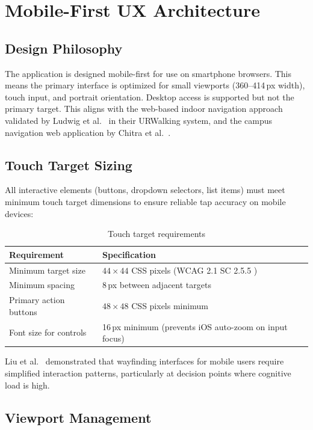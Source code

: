 \section{Mobile-First UX Architecture}
\label{sec:mobile-ux}

\subsection{Design Philosophy}

The application is designed mobile-first for use on smartphone browsers. This means the primary interface is optimized for small viewports (360--414\,px width), touch input, and portrait orientation. Desktop access is supported but not the primary target. This aligns with the web-based indoor navigation approach validated by Ludwig et al.\ \cite{Ludwig2023} in their URWalking system, and the campus navigation web application by Chitra et al.\ \cite{Chitra2023}.

\subsection{Touch Target Sizing}

All interactive elements (buttons, dropdown selectors, list items) must meet minimum touch target dimensions to ensure reliable tap accuracy on mobile devices:

\begin{table}[H]
\centering
\caption{Touch target requirements}
\begin{tabularx}{0.85\textwidth}{lX}
\toprule
\textbf{Requirement} & \textbf{Specification} \\
\midrule
Minimum target size & $44 \times 44$ CSS pixels (WCAG 2.1 SC 2.5.5 \cite{WCAG21}) \\
Minimum spacing & 8\,px between adjacent targets \\
Primary action buttons & $48 \times 48$ CSS pixels minimum \\
Font size for controls & 16\,px minimum (prevents iOS auto-zoom on input focus) \\
\bottomrule
\end{tabularx}
\end{table}

Liu et al.\ \cite{Liu2009} demonstrated that wayfinding interfaces for mobile users require simplified interaction patterns, particularly at decision points where cognitive load is high.

\subsection{Viewport Management}

